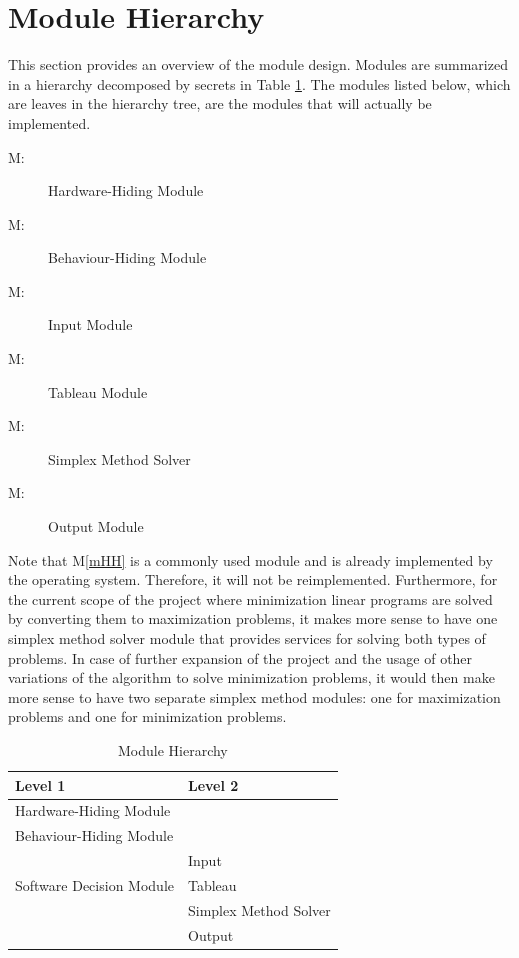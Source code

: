 \documentclass[12pt, titlepage]{article}
\newcounter{mnum}
\newcommand{\mthemnum}{M\themnum}
\newcommand{\mref}[1]{M\ref{#1}}
\begin{document}
\section{Module Hierarchy} \label{SecMH}

This section provides an overview of the module design. Modules are summarized
in a hierarchy decomposed by secrets in Table \ref{TblMH}. The modules listed
below, which are leaves in the hierarchy tree, are the modules that will
actually be implemented.

\begin{description}
\item [ \mthemnum \label{mHH}:] Hardware-Hiding Module
\item [ \mthemnum \label{mBH}:] Behaviour-Hiding Module
\item [ \mthemnum \label{mInput}:] Input Module
\item [ \mthemnum \label{mTableau}:] Tableau Module
\item [ \mthemnum \label{mSimplex}:] Simplex Method Solver
\item [ \mthemnum \label{mOutput}:] Output Module
\end{description}

Note that \mref{mHH} is a commonly used module and is already implemented by 
the operating system. Therefore, it will not be reimplemented. Furthermore, for 
the current scope of the project where minimization linear programs are solved 
by converting them to maximization problems, it makes more sense to have one 
simplex method solver module that provides services for solving both types of 
problems. In case of further expansion of the project and the usage of other 
variations of the algorithm to solve minimization problems, it would then make 
more sense to have two separate simplex method modules: one for maximization 
problems and one for minimization problems.

\begin{table}[h!]
\centering
\begin{tabular}{p{} p{}}
\toprule
\textbf{Level 1} & \textbf{Level 2}\\
\midrule

{Hardware-Hiding Module} & ~ \\
\midrule

{Behaviour-Hiding Module} & ~ \\
\midrule

\multirow{3}{0.3\textwidth}{Software Decision Module}
& Input\\ 
& Tableau\\
& Simplex Method Solver\\
& Output\\
\bottomrule

\end{tabular}
\caption{Module Hierarchy}
\label{TblMH}
\end{table}
\end{document}
